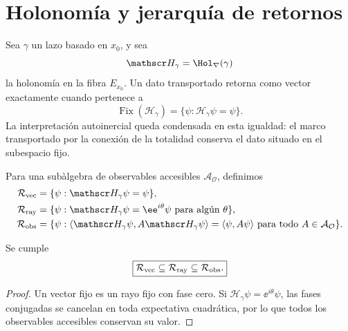 \section{Holonom\'ia y jerarqu\'ia de retornos}

Sea \(\gamma\) un lazo basado en \(x_0\), y sea
\begin{equation}
 \mathscr H_\gamma=\Hol_\nabla(\gamma)
 \label{eq:rm-obs-holonomy}
\end{equation}
la holonom\'ia en la fibra \(E_{x_0}\). Un dato transportado retorna como
vector exactamente cuando pertenece a
\begin{equation}
 \operatorname{Fix}(\mathscr H_\gamma)
 =\{\psi:\mathscr H_\gamma\psi=\psi\}.
 \label{eq:rm-obs-fix-holonomy}
\end{equation}
La interpretaci\'on autoinercial queda condensada en esta igualdad: el marco
transportado por la conexi\'on de la totalidad conserva el dato situado en
el subespacio fijo.

Para una sub\`algebra de observables accesibles
\(\mathcal A_{\mathcal O}\), definimos
\begin{align}
 \mathcal R_{\rm vec}
 &=\{\psi:\mathscr H_\gamma\psi=\psi\},
 \label{eq:rm-obs-return-vector}\\
 \mathcal R_{\rm ray}
 &=\{\psi:\mathscr H_\gamma\psi=\ee^{i\theta}\psi
 \text{ para alg\'un }\theta\},
 \label{eq:rm-obs-return-ray}\\
 \mathcal R_{\rm obs}
 &=\{\psi:
 \langle\mathscr H_\gamma\psi,A\mathscr H_\gamma\psi\rangle
 =\langle\psi,A\psi\rangle
 \text{ para todo }A\in\mathcal A_{\mathcal O}\}.
 \label{eq:rm-obs-return-observable}
\end{align}

\begin{proposition}
\label{prop:rm-obs-return-hierarchy}
Se cumple
\begin{equation}
 \boxed{
 \mathcal R_{\rm vec}
 \subseteq\mathcal R_{\rm ray}
 \subseteq\mathcal R_{\rm obs}.}
 \label{eq:rm-obs-return-hierarchy}
\end{equation}
\end{proposition}

\begin{proof}
Un vector fijo es un rayo fijo con fase cero. Si
\(\mathscr H_\gamma\psi=\ee^{i\theta}\psi\), las fases conjugadas se
cancelan en toda expectativa cuadr\'atica, por lo que todos los observables
accesibles conservan su valor.
\end{proof}


